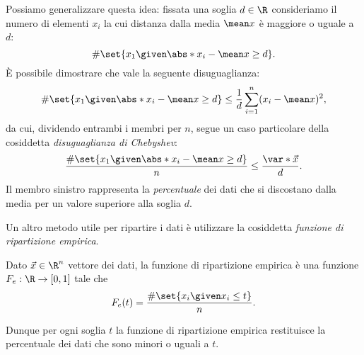 Possiamo generalizzare questa idea: fissata una soglia $d \in \R$ consideriamo il numero di elementi $x_i$ la cui distanza dalla media $\mean x$ è maggiore o uguale a $d$: \[
    \#\set{x_1 \given \abs*{x_i - \mean x} \geq d}.
\] È possibile dimostrare che vale la seguente disuguaglianza: \[
    \#\set{x_1 \given \abs*{x_i - \mean x} \geq d} \leq \frac{1}{d}\sum_{i=1}^n (x_i - \mean x)^2,
\] da cui, dividendo entrambi i membri per $n$, segue un caso particolare della cosiddetta \emph{disuguaglianza di Chebyshev}: \begin{equation}
    \frac{\#\set{x_1 \given \abs*{x_i - \mean x} \geq d}}{n} \leq \frac{\var*{\vec x}}{d}.
\end{equation} Il membro sinistro rappresenta la \emph{percentuale} dei dati che si discostano dalla media per un valore superiore alla soglia $d$.

Un altro metodo utile per ripartire i dati è utilizzare la cosiddetta \emph{funzione di ripartizione empirica}.
\begin{definition}
    Dato $\vec{x} \in \R^n$ vettore dei dati, la funzione di ripartizione empirica è una funzione $F_e : \R \to [0,1]$ tale che \begin{equation*}
        F_e(t) = \frac{\#\set{x_i \given x_i \leq t}}{n}.
    \end{equation*}
\end{definition}
Dunque per ogni soglia $t$ la funzione di ripartizione empirica restituisce la percentuale dei dati che sono minori o uguali a $t$.

